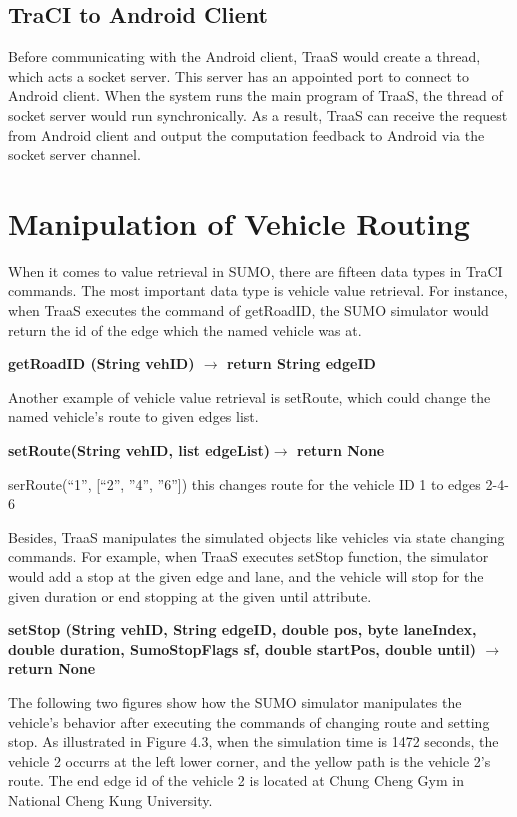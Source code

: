 \documentclass[12pt]{ksthesis}
\begin{document}
\begin{thesis}
{\subsection{TraCI to Android Client}
Before communicating with the Android client, TraaS would create a thread, which acts a socket server. This server has an appointed port to connect to Android client. When the system runs the main program of TraaS, the thread of socket server would run synchronically. As a result, TraaS can receive the request from Android client and output the computation feedback to Android via the socket server channel.

\section{Manipulation of Vehicle Routing}
When it comes to value retrieval in SUMO, there are fifteen data types in TraCI commands. The most important data type is vehicle value retrieval. For instance, when TraaS executes the command of getRoadID, the SUMO simulator would return the id of the edge which the named vehicle was at.

\textbf{getRoadID (String vehID) $\rightarrow$ return String edgeID}


Another example of vehicle value retrieval is setRoute, which could change the named vehicle’s route to given edges list.

\textbf{setRoute(String vehID, list edgeList)$\rightarrow$ return None}

serRoute(“1”, [“2”, ”4”, ”6”]) this changes route for the vehicle ID 1 to edges 2-4-6

Besides, TraaS manipulates the simulated objects like vehicles via state changing commands. For example, when TraaS executes setStop function, the simulator would add a stop at the given edge and lane, and the vehicle will stop for the given duration or end stopping at the given until attribute.
 
\textbf{setStop (String vehID, String edgeID, double pos, byte laneIndex, double duration, SumoStopFlags sf, double startPos, double until) $\rightarrow$ return None}
 
The following two figures show how the SUMO simulator manipulates the vehicle’s behavior after executing the commands of changing route and setting stop.
As illustrated in Figure 4.3, when the simulation time is 1472 seconds, the vehicle 2 occurrs at the left lower corner, and the yellow path is the vehicle 2’s route. 
The end edge id of the vehicle 2 is located at Chung Cheng Gym in National Cheng Kung University.

}
\end{thesis}
\end{document}
